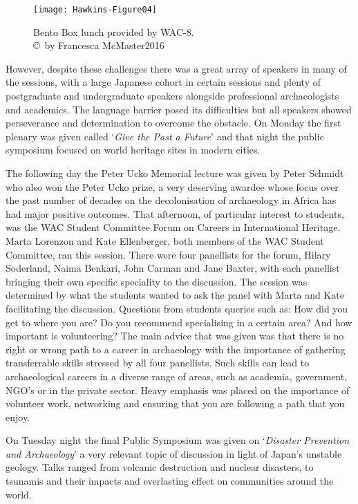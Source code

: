 \documentclass[spanish]{ijsra}
\def\authortwo{Francesca McMaster}
\begin{document}
\begin{figure}[!htb] %
	\centering
	\texttt{[image: Hawkins-Figure04]}
	\caption{Bento Box lunch provided by WAC-8. 
		{\normalfont\scriptsize \\ \copyright\ by \authortwo 2016}}
	\label{fig:Hawkins-Figure04}
\end{figure}

However, despite these challenges there was a great array of speakers in many of the sessions, with a large Japanese cohort in certain sessions and plenty of postgraduate and undergraduate speakers alongside professional archaeologists and academics. The language barrier posed its difficulties but all speakers showed perseverance and determination to overcome the obstacle. On Monday the first plenary was given called ‘\textit{Give the Past a Future}’ and that night the public symposium focused on world heritage sites in modern cities. 

The following day the Peter Ucko Memorial lecture was given by Peter Schmidt who also won the Peter Ucko prize, a very deserving awardee whose focus over the past number of decades on the decolonisation of archaeology in Africa has had major positive outcomes. That afternoon, of particular interest to students, was the WAC Student Committee Forum on Careers in International Heritage. Marta Lorenzon and Kate Ellenberger, both members of the WAC Student Committee, ran this session. There were four panellists for the forum, Hilary Soderland, Naima Benkari, John Carman and Jane Baxter, with each panellist bringing their own specific speciality to the discussion. The session was determined by what the students wanted to ask the panel with Marta and Kate facilitating the discussion. Questions from students queries such as: How did you get to where you are? Do you recommend specialising in a certain area? And how important is volunteering? The main advice that was given was that there is no right or wrong path to a career in archaeology with the importance of gathering transferrable skills stressed by all four panellists. Such skills can lead to archaeological careers in a diverse range of areas, such as academia, government, NGO’s or in the private sector. Heavy emphasis was placed on the importance of volunteer work, networking and ensuring that you are following a path that you enjoy. 

On Tuesday night the final Public Symposium was given on ‘\textit{Disaster Prevention and Archaeology}’ a very relevant topic of discussion in light of Japan’s unstable geology. Talks ranged from volcanic destruction and nuclear disasters, to tsunamis and their impacts and everlasting effect on communities around the world.
\end{document}
